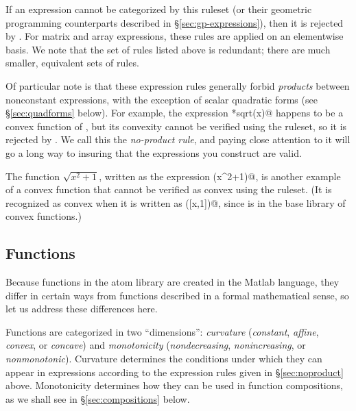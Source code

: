 \documentclass[12pt]{article}
\begin{document}
If an expression cannot be categorized by this ruleset (or their
geometric programming counterparts described 
in \S\ref{sec:gp-expressions}), then it is rejected by \cvx.
For matrix and array expressions, these rules
are applied on an elementwise basis.
We note that the set of rules listed above is redundant;
there are much smaller, equivalent sets of rules.

Of particular note is that these expression rules generally 
forbid \emph{products}
between nonconstant expressions,  
with the exception of scalar quadratic forms 
(see \S\ref{sec:quadforms} below). 
For example, the expression \verb@x*sqrt(x)@ happens to be a 
convex function of \verb@x@, but its convexity cannot be verified
using the \cvx ruleset, so it is rejected by \cvx.
We call this the \emph{no-product rule},
and paying close attention to it will go a long way to insuring that the
expressions you construct are valid.

The function $\sqrt{x^2+1}$, written as the expression 
\verb@sqrt(x^2+1)@, is another example of a convex 
function that cannot be verified 
as convex using the \cvx ruleset.
(It is recognized as convex when it is written as \verb@norm([x,1])@,
since \verb@norm@ is in the \cvx base library of convex functions.)

\subsection{Functions}
\label{sec:functions}

Because functions in the \cvx atom library are created in the 
Matlab language,
they differ in certain ways from functions described in a 
formal mathematical sense,
so let us address these differences here.  

Functions are categorized in
two ``dimensions'': \emph{curvature}
(\emph{constant}, \emph{affine},
\emph{convex}, or \emph{concave}) and
\emph{monotonicity}
(\emph{nondecreasing}, \emph{nonincreasing}, or \emph{nonmonotonic}).
Curvature determines the conditions
under which they can appear in expressions according to the
expression rules given in \S\ref{sec:noproduct} above.
Monotonicity determines
how they can be used in function  compositions, 
as we shall see in \S\ref{sec:compositions} below.
\end{document}
